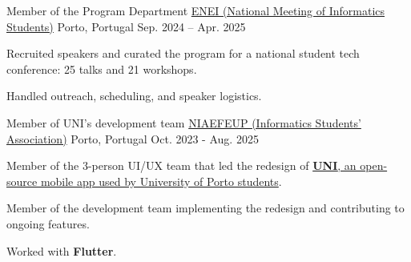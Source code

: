 \begin{cventries}
    \cventry
      {Member of the Program Department} %
      {\href{https://web.archive.org/web/20250421104133/https:/www.eneiconf.pt/events}{ENEI (National Meeting of Informatics Students)}} %
      {Porto, Portugal} %
      {Sep. 2024 – Apr. 2025} %
      {
        \begin{cvitems}
          \item {Recruited speakers and curated the program for a national student tech conference: 25 talks and 21 workshops.}
          \item {Handled outreach, scheduling, and speaker logistics.}
        \end{cvitems}
      }
      
  \cventry
    {Member of UNI's development team} %
    {\href{https://niaefeup.pt/}{NIAEFEUP (Informatics Students' Association)}} %
    {Porto, Portugal} %
    {Oct. 2023 - Aug. 2025} %
    {
        \begin{cvitems}
          \item {Member of the 3-person UI/UX team that led the redesign of \href{https://play.google.com/store/apps/details?id=pt.up.fe.ni.uni&hl=en}{\textbf{UNI}, an open-source mobile app used by University of Porto students}.}
          \item {Member of the development team implementing the redesign and contributing to ongoing features.}
          \item {Worked with \textbf{Flutter}.}
        \end{cvitems}
    }

\end{cventries}
